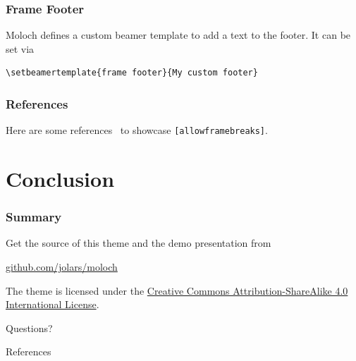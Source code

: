 \documentclass[10pt]{beamer}
\begin{document}
  {%
    \begin{frame}[fragile]
      \frametitle{Frame Footer}
      Moloch defines a custom beamer template to add a text to the
      footer. It can be set via
      \begin{verbatim}\setbeamertemplate{frame footer}{My custom footer}
      \end{verbatim}
    \end{frame}
  }

  \begin{frame}[fragile]
    \frametitle{References}
    Here are some
    references~\cite{Knuth92,ConcreteMath,Simpson,Er01,greenwade93}
    to showcase \verb+[allowframebreaks]+.
  \end{frame}

  \section{Conclusion}

  \begin{frame}
    \frametitle{Summary}

    Get the source of this theme and the demo presentation from
    \begin{center}
      \url{github.com/jolars/moloch}
    \end{center}

    The theme is licensed under the
    \href{http://creativecommons.org/licenses/by-sa/4.0/}{Creative Commons
    Attribution-ShareAlike 4.0 International License}.

    \begin{center}
      \ccbysa
    \end{center}

  \end{frame}

  \begin{frame}[standout]
    Questions?
  \end{frame}

  \appendix

  \begin{frame}[allowframebreaks]{References}
    
    
  \end{frame}

  
\end{document}
